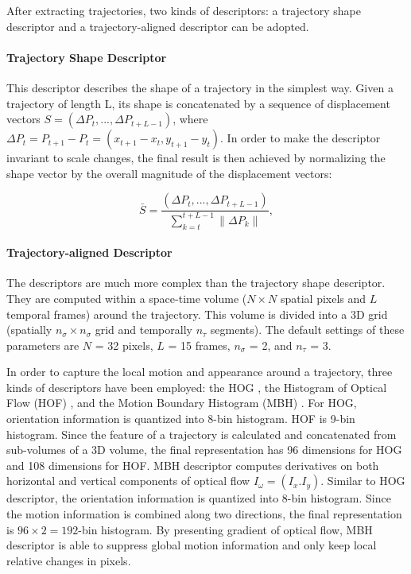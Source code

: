 \documentclass[review]{elsarticle}
\begin{document}
After extracting trajectories, two kinds of descriptors: a trajectory shape descriptor and a trajectory-aligned descriptor can be adopted.

\paragraph{Trajectory Shape Descriptor}This descriptor describes the shape of a trajectory in the simplest way. Given a trajectory of length L, its shape is concatenated by a sequence of displacement vectors \textit{$S = (\Delta P_t, ..., \Delta P_{t+L-1})$}, where \textit{$\Delta P_t = P_{t+1} - P_t = (x_{t+1} - x_t, y_{t+1} - y_t)$}. In order to make the descriptor invariant to scale changes, the final result is then achieved by normalizing the shape vector by the overall magnitude of the displacement vectors:

\begin{equation}
	\textit{$\bar{S} = \frac{(\Delta P_t, ..., \Delta P_{t+L-1})}{\sum_{k=t}^{t+L-1}\|\Delta P_k\|}$},
\end{equation}

\paragraph{Trajectory-aligned Descriptor}The descriptors are much more complex than the trajectory shape descriptor. They are computed within a space-time volume ($N \times N$ spatial pixels and $L$ temporal frames) around the trajectory. This volume is divided into a 3D grid (spatially $n_\sigma \times n_\sigma$ grid and temporally $n_\tau$ segments). The default settings of these parameters are $N$ = 32 pixels, $L$ = 15 frames, $n_\sigma$ = 2, and $n_\tau$ = 3.

In order to capture the local motion and appearance around a trajectory, three kinds of descriptors have been employed: the HOG \cite{dalal2005histograms}, the Histogram of Optical Flow (HOF) \cite{laptev2008learning}, and the Motion Boundary Histogram (MBH) \cite{dalal2006human}. For HOG, orientation information is quantized into 8-bin histogram. HOF is 9-bin histogram. Since the feature of a trajectory is calculated and concatenated from sub-volumes of a 3D volume, the final representation has 96 dimensions for HOG and 108 dimensions for HOF. MBH descriptor computes derivatives on both horizontal and vertical components of optical flow $I_\omega = (I_x. I_y)$. Similar to HOG descriptor, the orientation information is quantized into 8-bin histogram. Since the motion information is combined along two directions, the final representation is $96 \times 2 = 192$-bin histogram. By presenting gradient of optical flow, MBH descriptor is able to suppress global motion information and only keep local relative changes in pixels.
\end{document}
